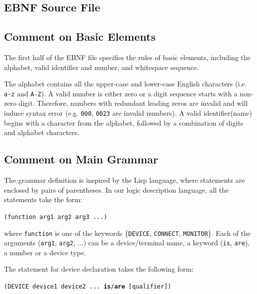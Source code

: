\documentclass[12pt]{article}
\def\n{\noindent}
\begin{document}
\subsection{EBNF Source File}



\subsection{Comment on Basic Elements}

The first half of the EBNF file specifies the rules of basic elements, including the
alphabet, valid identifier and number, and whitespace sequence.

\vspace{0.3cm}

\n The alphabet contains all the upper-case and lower-case English characters
(i.e. \texttt{a-z} and \texttt{A-Z}). A valid number is either zero or a digit
sequence starts with a non-zero digit. Therefore, numbers with redundant leading
zeros are invalid and will induce syntax error (e.g. \texttt{000}, \texttt{0023}
are invalid numbers). A valid identifier(name) begins with a character from the
alphabet, followed by a combination of digits and alphabet characters.

\subsection{Comment on Main Grammar}

The grammar definition is inspired by the Lisp language, where statements are
enclosed by pairs of parentheses. In our logic description language, all the
statements take the form:

\vspace{0.5cm}
\texttt{(function arg1 arg2 arg3 ...)}
\vspace{0.5cm}

\n where \texttt{function} is one of the keywords \{\texttt{DEVICE},
\texttt{CONNECT}, \texttt{MONITOR}\}. Each of the arguments (\texttt{arg1},
\texttt{arg2}, ...) can be a device/terminal name, a keyword (\texttt{is},
\texttt{are}), a number or a device type. \vspace{0.3cm}

\n The statement for device declaration takes the following form:

\vspace{0.5cm} \texttt{(DEVICE device1 device2 ... \textbf{is}/\textbf{are}
   [qualifier])} \vspace{0.5cm}
\end{document}
